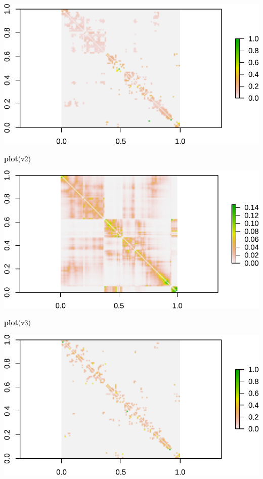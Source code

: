 \documentclass[
  a4paper,
]{article}
\newenvironment{Shaded}{\begin{snugshade}}{\end{snugshade}}
\newcommand{\FunctionTok}[1]{\textcolor[rgb]{0.13,0.29,0.53}{\textbf{#1}}}
\newcommand{\NormalTok}[1]{#1}
\begin{document}
\includegraphics{assignment2_files/figure-latex/unnamed-chunk-10-1.pdf}

\begin{Shaded}
\begin{Highlighting}[]
\FunctionTok{plot}\NormalTok{(v2)}
\end{Highlighting}
\end{Shaded}

\includegraphics{assignment2_files/figure-latex/unnamed-chunk-10-2.pdf}

\begin{Shaded}
\begin{Highlighting}[]
\FunctionTok{plot}\NormalTok{(v3)}
\end{Highlighting}
\end{Shaded}

\includegraphics{assignment2_files/figure-latex/unnamed-chunk-10-3.pdf}
\end{document}
